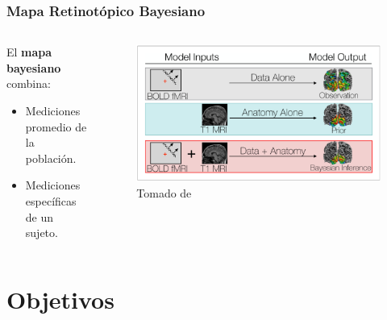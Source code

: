 \documentclass[
11pt, %
%
aspectratio=169, %
]{beamer}
\begin{document}
\begin{frame}
	\frametitle{Mapa Retinot\'opico Bayesiano}
	
	\begin{columns}
		
		\begin{column}{0.3\textwidth}
			El \textbf{mapa bayesiano} combina:
			\begin{itemize}
				\item Mediciones promedio de la población.
				\item Mediciones específicas de un sujeto.
			\end{itemize}	
		\end{column}
		
		\begin{column}{0.7\textwidth} %
		
			\begin{figure}
				
				\captionsetup{font=tiny}
				\includegraphics[scale=0.4]{Graphics/bayesian}
				\caption{Tomado de \cite{benson_bayesian_2018}}
			\end{figure}
		\end{column}					
		
	\end{columns}
	

	
\end{frame}


	\section{Objetivos} %
	
\end{document}

